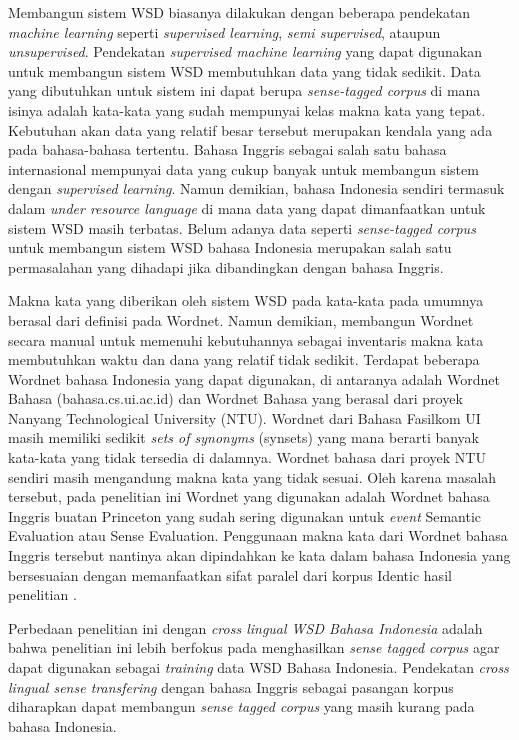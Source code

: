 Membangun sistem WSD biasanya dilakukan dengan beberapa pendekatan \textit{machine learning} seperti \textit{supervised learning}, \textit{semi supervised}, ataupun \textit{unsupervised}. Pendekatan \textit{supervised machine learning} yang dapat digunakan untuk membangun sistem WSD membutuhkan data yang tidak sedikit. Data yang dibutuhkan untuk sistem ini dapat berupa \textit{sense-tagged corpus} di mana isinya adalah kata-kata yang sudah mempunyai kelas makna kata yang tepat. Kebutuhan akan data yang relatif besar tersebut merupakan kendala yang ada pada bahasa-bahasa tertentu. Bahasa Inggris sebagai salah satu bahasa internasional mempunyai data yang cukup banyak untuk membangun sistem dengan \textit{supervised learning}. Namun demikian, bahasa Indonesia sendiri termasuk dalam \textit{under resource language} di mana data yang dapat dimanfaatkan untuk sistem WSD masih terbatas. Belum adanya data seperti \textit{sense-tagged corpus} untuk membangun sistem WSD bahasa Indonesia merupakan salah satu permasalahan yang dihadapi jika dibandingkan dengan bahasa Inggris.

Makna kata yang diberikan oleh sistem WSD pada kata-kata pada umumnya berasal dari definisi pada Wordnet. Namun demikian, membangun Wordnet secara manual untuk memenuhi kebutuhannya sebagai inventaris makna kata membutuhkan waktu dan dana yang relatif tidak sedikit. Terdapat beberapa Wordnet bahasa Indonesia yang dapat digunakan, di antaranya adalah Wordnet Bahasa (bahasa.cs.ui.ac.id) dan Wordnet Bahasa yang berasal dari proyek Nanyang Technological University (NTU).  Wordnet dari Bahasa Fasilkom UI masih memiliki sedikit \textit{sets of synonyms} (synsets) yang mana berarti banyak kata-kata yang tidak tersedia di dalamnya. Wordnet bahasa dari proyek NTU sendiri masih mengandung makna kata yang tidak sesuai. Oleh karena masalah tersebut, pada penelitian ini Wordnet yang digunakan adalah Wordnet bahasa Inggris buatan Princeton yang sudah sering digunakan untuk \textit{event} Semantic Evaluation atau Sense Evaluation. Penggunaan makna kata dari Wordnet bahasa Inggris tersebut nantinya akan dipindahkan ke kata dalam bahasa Indonesia yang bersesuaian dengan memanfaatkan sifat paralel dari korpus Identic hasil penelitian \citep{larasati2012identic}.

Perbedaan penelitian ini dengan \textit{cross lingual WSD Bahasa Indonesia} \citep{septiantri2013wsd} adalah bahwa penelitian ini lebih berfokus pada menghasilkan \textit{sense tagged corpus} agar dapat digunakan sebagai \textit{training} data WSD Bahasa Indonesia. Pendekatan \textit{cross lingual sense transfering} dengan bahasa Inggris sebagai pasangan korpus diharapkan dapat membangun \textit{sense tagged corpus} yang masih kurang pada bahasa Indonesia. 
